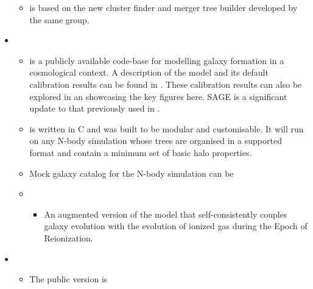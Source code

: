 \documentclass[letterpaper,10pt,english]{sphinxmanual}
\begin{document}
\begin{itemize}
\begin{itemize}
\item {} 
 is based on the new cluster finder  and
merger tree builder  developed by the same group.

\end{itemize}

\item {} 
\begin{itemize}
\item {} 
 is a publicly available code-base for modelling galaxy
formation in a cosmological context. A description of the model
and its default calibration results can be found in . These calibration
results can also be explored in an 
showcasing the key figures here. SAGE is a significant update to
that previously used in .

\item {} 
 is written in C and was built to be modular and
customisable. It will run on any N-body simulation whose trees are
organised in a supported format and contain a minimum set of basic
halo properties.

\item {} 
Mock galaxy catalog for the  N-body simulation can be

\item {} 
\begin{itemize}
\item {} 
An augmented version of the  model that
self-consistently couples galaxy evolution with the evolution
of ionized gas during the Epoch of Reionization.

\end{itemize}

\end{itemize}

\item {} 
\begin{itemize}
\item {} 
The public version is 


\end{itemize}
\end{itemize}
\end{document}
